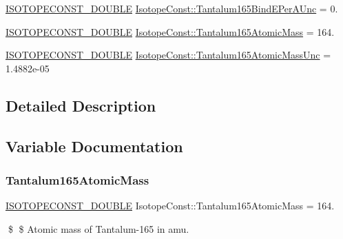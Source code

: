 \begin{DoxyCompactItemize}
\mbox{\hyperlink{group___isotope_const-_macros_ga8f45a7272ce02c0b4c65c44636ed719a}{I\+S\+O\+T\+O\+P\+E\+C\+O\+N\+S\+T\+\_\+\+D\+O\+U\+B\+LE}} \mbox{\hyperlink{group___isotope_const-_tantalum-_ta165_gadca3e65b889c8458817f61350dadb056}{Isotope\+Const\+::\+Tantalum165\+Bind\+E\+Per\+A\+Unc}} = 0.
\item 
\mbox{\hyperlink{group___isotope_const-_macros_ga8f45a7272ce02c0b4c65c44636ed719a}{I\+S\+O\+T\+O\+P\+E\+C\+O\+N\+S\+T\+\_\+\+D\+O\+U\+B\+LE}} \mbox{\hyperlink{group___isotope_const-_tantalum-_ta165_gad3ce076a3759ba0424b235125f12a251}{Isotope\+Const\+::\+Tantalum165\+Atomic\+Mass}} = 164.
\item 
\mbox{\hyperlink{group___isotope_const-_macros_ga8f45a7272ce02c0b4c65c44636ed719a}{I\+S\+O\+T\+O\+P\+E\+C\+O\+N\+S\+T\+\_\+\+D\+O\+U\+B\+LE}} \mbox{\hyperlink{group___isotope_const-_tantalum-_ta165_ga5bcd5cc2105c727110510133baa4abba}{Isotope\+Const\+::\+Tantalum165\+Atomic\+Mass\+Unc}} = 1.\+4882e-\/05
\end{DoxyCompactItemize}


\subsection{Detailed Description}


\subsection{Variable Documentation}
\mbox{\label{group___isotope_const-_tantalum-_ta165_gad3ce076a3759ba0424b235125f12a251}} 
\subsubsection{\texorpdfstring{Tantalum165\+Atomic\+Mass}{Tantalum165AtomicMass}}
{\footnotesize\ttfamily \mbox{\hyperlink{group___isotope_const-_macros_ga8f45a7272ce02c0b4c65c44636ed719a}{I\+S\+O\+T\+O\+P\+E\+C\+O\+N\+S\+T\+\_\+\+D\+O\+U\+B\+LE}} Isotope\+Const\+::\+Tantalum165\+Atomic\+Mass = 164.}

\$ \$ Atomic mass of Tantalum-\/165 in amu. \mbox{\label{group___isotope_const-_tantalum-_ta165_ga5bcd5cc2105c727110510133baa4abba}} 
